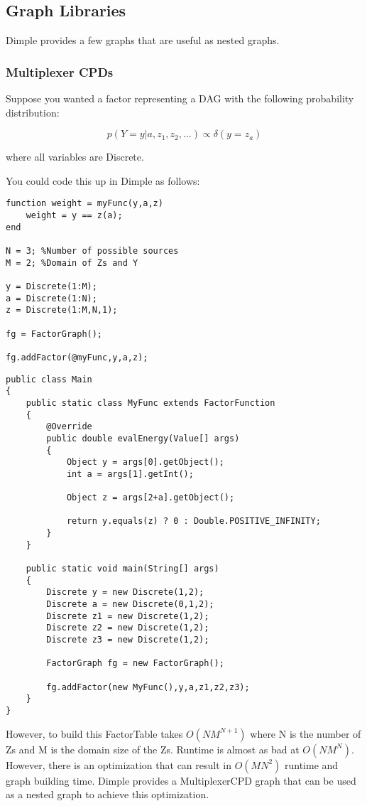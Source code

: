 \subsection{Graph Libraries}

Dimple provides a few graphs that are useful as nested graphs.

\subsubsection{Multiplexer CPDs}
\label{sec:multiplexerCPD}

Suppose you wanted a factor representing a DAG with the following probability distribution:

\[
p(Y=y|a,z_1,z_2,...) \propto \delta(y = z_a)
\]

where all variables are Discrete.

You could code this up in Dimple as follows:

\ifmatlab
\begin{lstlisting}
function weight = myFunc(y,a,z)
    weight = y == z(a);
end

N = 3; %Number of possible sources
M = 2; %Domain of Zs and Y

y = Discrete(1:M);
a = Discrete(1:N);
z = Discrete(1:M,N,1);
 
fg = FactorGraph();
 
fg.addFactor(@myFunc,y,a,z);
\end{lstlisting}
\fi

\ifjava
\begin{lstlisting}
public class Main 
{		
	public static class MyFunc extends FactorFunction
	{
		@Override
		public double evalEnergy(Value[] args)
		{
			Object y = args[0].getObject();
			int a = args[1].getInt();
			
			Object z = args[2+a].getObject();
			
			return y.equals(z) ? 0 : Double.POSITIVE_INFINITY;
		}
	}
	
	public static void main(String[] args)
	{
		Discrete y = new Discrete(1,2);
		Discrete a = new Discrete(0,1,2);
		Discrete z1 = new Discrete(1,2);
		Discrete z2 = new Discrete(1,2);
		Discrete z3 = new Discrete(1,2);
		 
		FactorGraph fg = new FactorGraph();
		 
		fg.addFactor(new MyFunc(),y,a,z1,z2,z3);
	}
}
\end{lstlisting}
\fi

However, to build this FactorTable takes $O(NM^{N+1})$ where N is the number of Zs and M is the domain size of the Zs.  Runtime is almost as bad at $O(NM^N)$.  However, there is an optimization that can result in $O(MN^2)$ runtime and graph building time.  Dimple provides a MultiplexerCPD graph that can be used as a nested graph to achieve this optimization.

